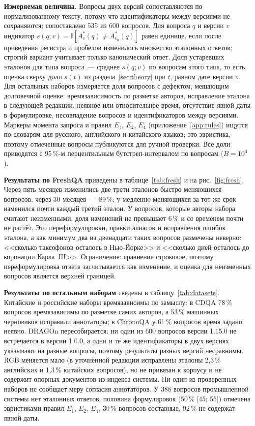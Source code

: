\documentclass{article}
\newcommand{\I}{\mathbb{I}}                         %
\begin{document}
\textbf{Измеряемая величина.} Вопросы двух версий сопоставляются по нормализованному тексту, потому что идентификаторы между версиями не сохраняются; сопоставлено 535 из 600 вопросов. Для вопроса $q$ и версии $v$ индикатор $s(q;v)=\I[A^*_v(q)\ne A^*_{v_0}(q)]$ равен единице, если после приведения регистра и пробелов изменилось множество эталонных ответов; строгий вариант учитывает только канонический ответ. Доля устаревших эталонов для типа вопроса~--- среднее $s(q;v)$ по вопросам этого типа, то есть оценка сверху доли $\bar s(t)$ из раздела~\ref{sec:theory} при $t$, равном дате версии $v$. Для остальных наборов измеряется доля вопросов с дефектом, мешающим долговечной оценке: времязависимость по разметке авторов, исправление эталона в следующей редакции, неявное или относительное время, отсутствие явной даты в формулировке, несовпадение вопросов и идентификаторов между версиями. Маркеры момента запроса и правил $E_1$, $E_2$, $E_4$ (приложение~\ref{app:rules}) ищутся по словарям для русского, английского и китайского языков; это эвристика, поэтому отмеченные вопросы публикуются для ручной проверки. Все доли приводятся с 95\,\%-м перцентильным бутстреп-интервалом по вопросам ($B=10^4$).

\textbf{Результаты по FreshQA} приведены в таблице~\ref{tab:fresh} и на рис.~\ref{fig:fresh}. Через пять месяцев изменились две трети эталонов быстро меняющихся вопросов, через 30 месяцев~--- 89\,\%; у медленно меняющихся за тот же срок изменился почти каждый третий эталон. У вопросов, которые авторы набора считают неизменными, доля изменений не превышает 6\,\% и со временем почти не растёт. Это переформулировки, правки алиасов и исправления ошибок эталона, а как минимум два из двенадцати таких вопросов размечены неверно: <<сколько таксофонов осталось в Нью-Йорке>> и <<сколько дней осталось до коронации Карла~III>>. Ограничение: сравнение строковое, поэтому переформулировка ответа засчитывается как изменение, и оценка для неизменных вопросов является верхней границей.

\textbf{Результаты по остальным наборам} сведены в таблицу~\ref{tab:datasets}. Китайские и российские наборы времязависимы по замыслу: в CDQA 78\,\% вопросов времязависимы по разметке самих авторов, а 53\,\% машинных черновиков исправили аннотаторы; в ChronoQA у 61\,\% вопросов время задано неявно. DRAGOn пересобирается: ни один из 600 вопросов версии 1.15.0 не встречается в версии 1.0.0, а одни и те же идентификаторы в двух версиях указывают на разные вопросы, поэтому результаты разных версий несравнимы. RGB меняется мало (в уточнённой редакции исправлены эталоны 2,3\,\% английских и 1,3\,\% китайских вопросов), но не привязан к корпусу и не содержит опорных документов из индекса системы. Ни один из проверенных наборов не сообщает меру согласия аннотаторов. У 388 вопросов промышленной системы нет эталонных ответов; половина формулировок (50\,\% [45; 55]) отмечена эвристиками правил $E_1$, $E_2$, $E_4$, 30\,\% вопросов составные, 92\,\% не содержат явной даты.
\end{document}
